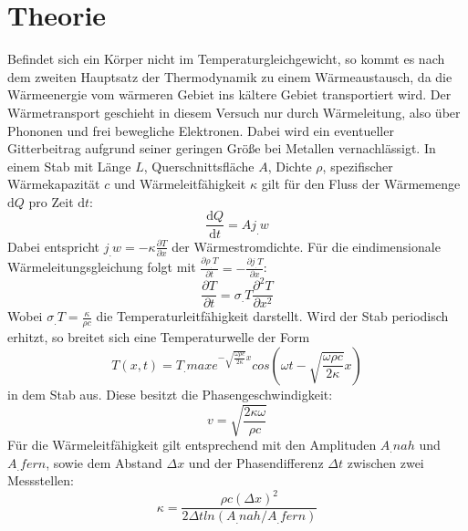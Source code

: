 
\section{Theorie}
\label{sec:Theorie}

Befindet sich ein Körper nicht im Temperaturgleichgewicht, so kommt es nach dem zweiten Hauptsatz der Thermodynamik zu einem Wärmeaustausch, da die Wärmeenergie vom wärmeren Gebiet ins kältere Gebiet transportiert wird. Der Wärmetransport geschieht in diesem Versuch nur durch Wärmeleitung, also über Phononen und frei bewegliche Elektronen. Dabei wird ein eventueller Gitterbeitrag aufgrund seiner geringen Größe bei Metallen vernachlässigt.\newline
In einem Stab mit Länge $L$, Querschnittsfläche $A$, Dichte $\rho$, spezifischer Wärmekapazität $c$ und Wärmeleitfähigkeit $\kappa$ gilt für den Fluss der Wärmemenge $\mathrm{d}Q$ pro Zeit $\mathrm{d}t$:
\begin{equation}
\frac{\mathrm{d}Q}{\mathrm{d}t} = A j_.w \label{eq:dQ/dt}
\end{equation}    
Dabei entspricht $j_.w = -\kappa \frac{\partial T}{\partial x}$ der Wärmestromdichte. \newline
Für die eindimensionale Wärmeleitungsgleichung folgt mit $\frac{\partial \rho_.T}{\partial t} = -\frac{\partial j_.T}{\partial x}$:
\begin{equation}
\frac{\partial T}{\partial t} = \sigma_.T \frac{\partial^2 T}{\partial x^2} \label{eq:T/t}
\end{equation}
Wobei $\sigma_.T = \frac{\kappa}{\rho c}$ die Temperaturleitfähigkeit darstellt.\newline
Wird der Stab periodisch erhitzt, so breitet sich eine Temperaturwelle der Form
\begin{equation}
T(x, t) = T_.{max} e^{-\sqrt{\frac{\omega\rho c}{2\kappa}} x}cos\left(\omega t-\sqrt{\frac{\omega\rho c}{2\kappa}}x\right) \label{eq:T}
\end{equation}
in dem Stab aus. Diese besitzt die Phasengeschwindigkeit:
\begin{equation}
v = \sqrt{\frac{2\kappa\omega}{\rho c}} \label{eq:v}
\end{equation}
Für die Wärmeleitfähigkeit gilt entsprechend mit den Amplituden $A_.{nah}$ und $A_.{fern}$, sowie dem Abstand $\Delta x$ und der Phasendifferenz $\Delta t$  zwischen zwei Messstellen: 
\begin{equation}
\kappa = \frac{\rho c(\Delta x)^2}{2\Delta t ln(A_.{nah}/A_.{fern})} \label{eq:k}
\end{equation}